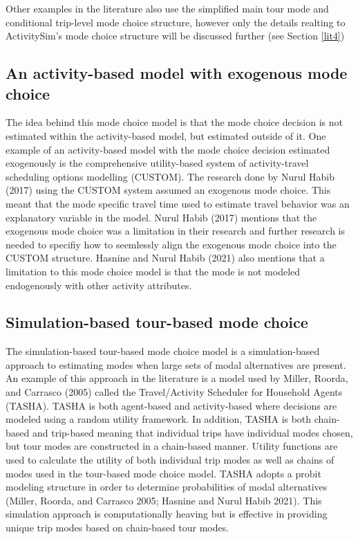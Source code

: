 \documentclass[12pt, oneside, openright]{byuthesis}
\begin{document}
Other examples in the literature also use the simplified main tour mode and conditional trip-level mode choice structure, however only the details realting to ActivitySim's mode choice structure will be discussed further (see Section \ref{lit4})

\hypertarget{lit34}{%
\subsection{An activity-based model with exogenous mode choice}\label{lit34}}

The idea behind this mode choice model is that the mode choice decision is not estimated within the activity-based model, but estimated outside of it. One example of an activity-based model with the mode choice decision estimated exogenously is the comprehensive utility-based system of activity-travel scheduling options modelling (CUSTOM). The research done by Nurul Habib (2017) using the CUSTOM system assumed an exogenous mode choice. This meant that the mode specific travel time used to estimate travel behavior was an explanatory variable in the model. Nurul Habib (2017) mentions that the exogenous mode choice was a limitation in their research and further research is needed to specifiy how to seemlessly align the exogenous mode choice into the CUSTOM structure. Hasnine and Nurul Habib (2021) also mentions that a limitation to this mode choice model is that the mode is not modeled endogenously with other activity attributes.

\hypertarget{lit35}{%
\subsection{Simulation-based tour-based mode choice}\label{lit35}}

The simulation-based tour-based mode choice model is a simulation-based approach to estimating modes when large sets of modal alternatives are present. An example of this approach in the literature is a model used by Miller, Roorda, and Carrasco (2005) called the Travel/Activity Scheduler for Household Agents (TASHA). TASHA is both agent-based and activity-based where decisions are modeled using a random utility framework. In addition, TASHA is both chain-based and trip-based meaning that individual trips have individual modes chosen, but tour modes are constructed in a chain-based manner. Utility functions are used to calculate the utility of both individual trip modes as well as chains of modes used in the tour-based mode choice model. TASHA adopts a probit modeling structure in order to determine probabilities of modal alternatives (Miller, Roorda, and Carrasco 2005; Hasnine and Nurul Habib 2021). This simulation approach is computationally heaving but is effective in providing unique trip modes based on chain-based tour modes.
\end{document}
